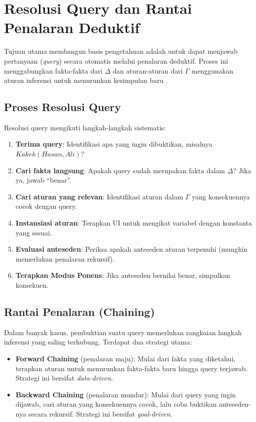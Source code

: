 \section{Resolusi Query dan Rantai Penalaran Deduktif}

Tujuan utama membangun basis pengetahuan adalah untuk dapat menjawab pertanyaan (\textit{query}) secara otomatis melalui penalaran deduktif. Proses ini menggabungkan fakta-fakta dari $\Delta$ dan aturan-aturan dari $\Gamma$ menggunakan aturan inferensi untuk menurunkan kesimpulan baru \cite{rosen2019}.

\subsection{Proses Resolusi Query}

Resolusi query mengikuti langkah-langkah sistematis:

\begin{enumerate}
    \item \textbf{Terima query}: Identifikasi apa yang ingin dibuktikan, misalnya $Kakek(Hasan, Ali)$?
    \item \textbf{Cari fakta langsung}: Apakah query sudah merupakan fakta dalam $\Delta$? Jika ya, jawab ``benar''.
    \item \textbf{Cari aturan yang relevan}: Identifikasi aturan dalam $\Gamma$ yang konsekuennya cocok dengan query.
    \item \textbf{Instansiasi aturan}: Terapkan UI untuk mengikat variabel dengan konstanta yang sesuai.
    \item \textbf{Evaluasi anteseden}: Periksa apakah anteseden aturan terpenuhi (mungkin memerlukan penalaran rekursif).
    \item \textbf{Terapkan Modus Ponens}: Jika anteseden bernilai benar, simpulkan konsekuen.
\end{enumerate}

\subsection{Rantai Penalaran (Chaining)}

Dalam banyak kasus, pembuktian suatu query memerlukan rangkaian langkah inferensi yang saling terhubung. Terdapat dua strategi utama:

\begin{itemize}
    \item \textbf{Forward Chaining} (penalaran maju): Mulai dari fakta yang diketahui, terapkan aturan untuk menurunkan fakta-fakta baru hingga query terjawab. Strategi ini bersifat \textit{data-driven}.
    \item \textbf{Backward Chaining} (penalaran mundur): Mulai dari query yang ingin dijawab, cari aturan yang konsekuennya cocok, lalu coba buktikan anteseden-nya secara rekursif. Strategi ini bersifat \textit{goal-driven}.
\end{itemize}

